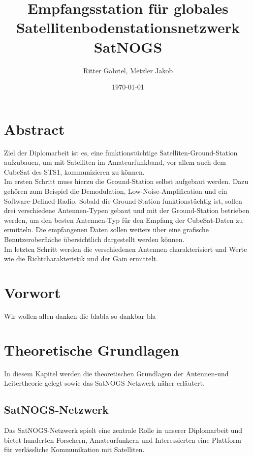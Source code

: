 \documentclass[12pt]{scrreprt}
\title{Empfangsstation für globales Satellitenbodenstationsnetzwerk SatNOGS}
\author{Ritter Gabriel, Metzler Jakob}
\date{\today}
\begin{document}
	
	\maketitle
	
	\chapter{Abstract}
	
	
	
	Ziel der Diplomarbeit ist es, eine funktionstüchtige Satelliten-Ground-Station aufzubauen, um mit 
	Satelliten im Amateurfunkband, vor allem auch dem CubeSat des STS1, kommunizieren zu können.\\
	
	Im ersten Schritt muss hierzu die Ground-Station selbst aufgebaut werden. Dazu gehören zum 
	Beispiel die Demodulation, Low-Noise-Amplification und ein Software-Defined-Radio. Sobald die 
	Ground-Station funktionstüchtig ist, sollen drei verschiedene Antennen-Typen gebaut und mit der 
	Ground-Station betrieben werden, um den besten Antennen-Typ für den Empfang der CubeSat-Daten zu ermitteln. Die empfangenen Daten sollen weiters über eine grafische Benutzeroberfläche 
	übersichtlich dargestellt werden können.\\
	
	Im letzten Schritt werden die verschiedenen Antennen charakterisiert und Werte wie die Richtcharakteristik und der Gain ermittelt.
	
	\chapter{Vorwort}
	Wir wollen allen danken die blabla so dankbar bla
	
	\tableofcontents
	\pagebreak
	
	\chapter{Theoretische Grundlagen}
	In diesem Kapitel werden die theoretischen Grundlagen der Antennen-und Leitertheorie gelegt sowie das SatNOGS Netzwerk näher erläutert.
	
	\section{SatNOGS-Netzwerk}
	Das SatNOGS-Netzwerk spielt eine zentrale Rolle in unserer Diplomarbeit und bietet hunderten Forschern, Amateurfunkern und Interessierten eine Plattform für verlässliche Kommunikation mit Satelliten.\\
	
\end{document}
